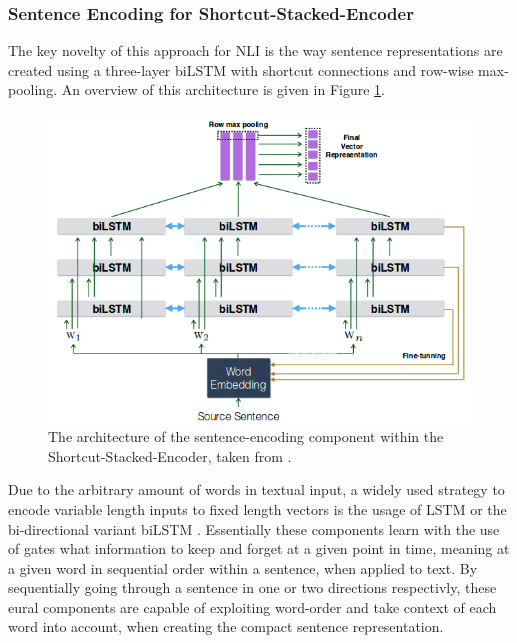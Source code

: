 \subsubsection{Sentence Encoding for Shortcut-Stacked-Encoder}
The key novelty of this approach for \ac{NLI} is the way sentence representations are created using a three-layer \ac{biLSTM} with shortcut connections and row-wise max-pooling. An overview of this architecture is given in Figure \ref{fig:sentence_emcoder_shortcut}.
\begin{figure}[tph!]
\centering
	\includegraphics[totalheight=8cm]{fig/sentence_encoder_shortcut.png}
	\caption{The architecture of the sentence-encoding component within the Shortcut-Stacked-Encoder, taken from \cite{nie2017shortcut}.}
	\label{fig:sentence_emcoder_shortcut}
\end{figure}
Due to the arbitrary amount of words in textual input, a widely used strategy to encode variable length inputs to fixed length vectors is the usage of \ac{LSTM} \citep{hochreiter1997long} or the bi-directional variant \ac{biLSTM} \citep{graves2005framewise}. Essentially these components learn with the use of gates what information to keep and forget at a given point in time, meaning at a given word in sequential order within a sentence, when applied to text. By sequentially going through a sentence in one or two directions respectivly, these eural components are capable of exploiting word-order and take context of each word into account, when creating the compact sentence representation.
\newline

